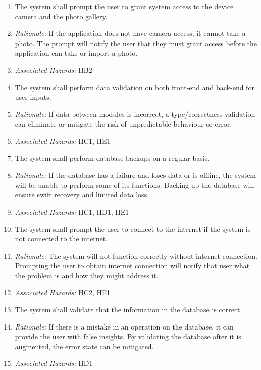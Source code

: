 \documentclass{article}
\begin{document}
\begin{enumerate}[label=SSR\arabic*.]
    \item The system shall prompt the user to grant system access to the device camera and the photo gallery.
    \item[] \emph{Rationale:} If the application does not have camera access, it cannot take a photo. The prompt will notify the user that they must grant access before the application can take or import a photo.
    \item[] \emph{Associated Hazards:} HB2

    \item The system shall perform data validation on both front-end and back-end for user inputs.
    \item[] \emph{Rationale:} If data between modules is incorrect, a type/correctness validation can eliminate or mitigate the risk of unpredictable behaviour or error.
    \item[] \emph{Associated Hazards:} HC1, HE1

    \item The system shall perform database backups on a regular basis.
    \item[] \emph{Rationale:} If the database has a failure and loses data or is offline, the system will be unable to perform some of its functions. Backing up the database will ensure swift recovery and limited data loss.
    \item[] \emph{Associated Hazards:} HC1, HD1, HE1

    \item The system shall prompt the user to connect to the internet if the system is not connected to the internet.
    \item[] \emph{Rationale:} The system will not function correctly without internet connection. Prompting the user to obtain internet connection will notify that user what the problem is and how they might address it.
    \item[] \emph{Associated Hazards:} HC2, HF1

    \item The system shall validate that the information in the database is correct.
    \item[] \emph{Rationale:} If there is a mistake in an operation on the database, it can provide the user with false insights. By validating the database after it is augmented, the error state can be mitigated.
    \item[] \emph{Associated Hazards:} HD1


\end{enumerate}
\end{document}

